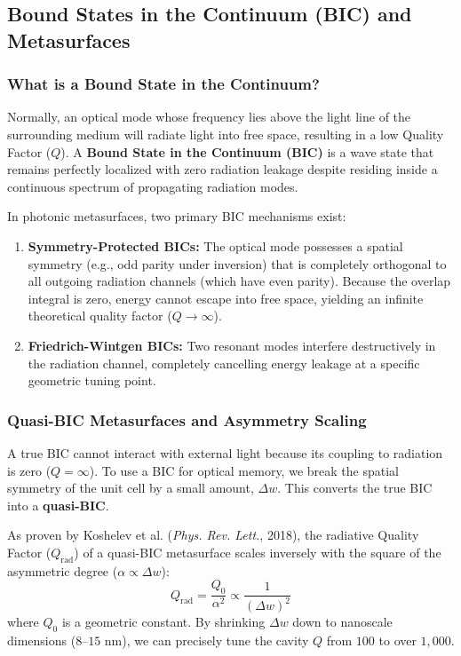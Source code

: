 \documentclass[11pt,a4paper]{article}
\begin{document}
\subsection{Bound States in the Continuum (BIC) and Metasurfaces}

\subsubsection{What is a Bound State in the Continuum?}
Normally, an optical mode whose frequency lies above the light line of the surrounding medium will radiate light into free space, resulting in a low Quality Factor ($Q$). A \textbf{Bound State in the Continuum (BIC)} is a wave state that remains perfectly localized with zero radiation leakage despite residing inside a continuous spectrum of propagating radiation modes.

In photonic metasurfaces, two primary BIC mechanisms exist:
\begin{enumerate}
    \item \textbf{Symmetry-Protected BICs:} The optical mode possesses a spatial symmetry (e.g., odd parity under inversion) that is completely orthogonal to all outgoing radiation channels (which have even parity). Because the overlap integral is zero, energy cannot escape into free space, yielding an infinite theoretical quality factor ($Q \to \infty$).
    \item \textbf{Friedrich-Wintgen BICs:} Two resonant modes interfere destructively in the radiation channel, completely cancelling energy leakage at a specific geometric tuning point.
\end{enumerate}

\subsubsection{Quasi-BIC Metasurfaces and Asymmetry Scaling}
A true BIC cannot interact with external light because its coupling to radiation is zero ($Q = \infty$). To use a BIC for optical memory, we break the spatial symmetry of the unit cell by a small amount, $\Delta w$. This converts the true BIC into a \textbf{quasi-BIC}.

As proven by Koshelev et al. (\textit{Phys. Rev. Lett.}, 2018), the radiative Quality Factor ($Q_{\text{rad}}$) of a quasi-BIC metasurface scales inversely with the square of the asymmetric degree ($\alpha \propto \Delta w$):
\begin{equation}
Q_{\text{rad}} = \frac{Q_0}{\alpha^2} \propto \frac{1}{(\Delta w)^2}
\end{equation}
where $Q_0$ is a geometric constant. By shrinking $\Delta w$ down to nanoscale dimensions ($8\text{--}15\text{ nm}$), we can precisely tune the cavity $Q$ from $100$ to over $1,000$.
\end{document}

